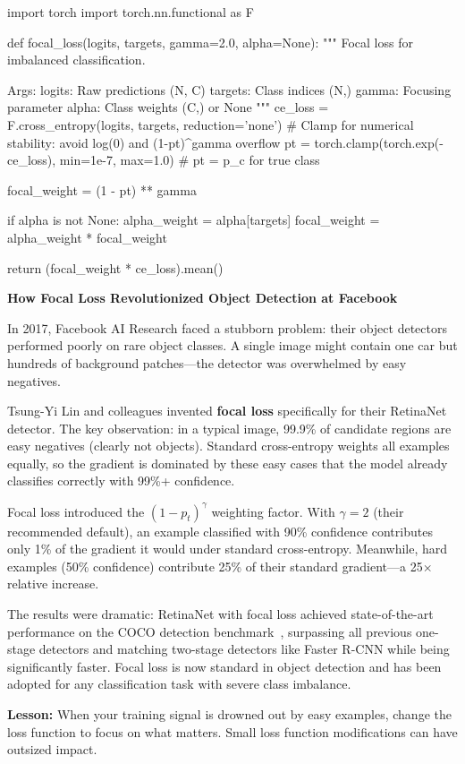 \documentclass[../../main.tex]{subfiles}
\begin{document}
\begin{pythoncode}
import torch
import torch.nn.functional as F

def focal_loss(logits, targets, gamma=2.0, alpha=None):
    """
    Focal loss for imbalanced classification.

    Args:
        logits: Raw predictions (N, C)
        targets: Class indices (N,)
        gamma: Focusing parameter
        alpha: Class weights (C,) or None
    """
    ce_loss = F.cross_entropy(logits, targets, reduction='none')
    # Clamp for numerical stability: avoid log(0) and (1-pt)^gamma overflow
    pt = torch.clamp(torch.exp(-ce_loss), min=1e-7, max=1.0)  # pt = p_c for true class

    focal_weight = (1 - pt) ** gamma

    if alpha is not None:
        alpha_weight = alpha[targets]
        focal_weight = alpha_weight * focal_weight

    return (focal_weight * ce_loss).mean()
\end{pythoncode}

\begin{warstory}
\textbf{How Focal Loss Revolutionized Object Detection at Facebook}

In 2017, Facebook AI Research faced a stubborn problem: their object detectors performed poorly on rare object classes. A single image might contain one car but hundreds of background patches---the detector was overwhelmed by easy negatives.

Tsung-Yi Lin and colleagues invented \textbf{focal loss} specifically for their RetinaNet detector. The key observation: in a typical image, 99.9\% of candidate regions are easy negatives (clearly not objects). Standard cross-entropy weights all examples equally, so the gradient is dominated by these easy cases that the model already classifies correctly with 99\%+ confidence.

Focal loss introduced the $(1 - p_t)^\gamma$ weighting factor. With $\gamma = 2$ (their recommended default), an example classified with 90\% confidence contributes only 1\% of the gradient it would under standard cross-entropy. Meanwhile, hard examples (50\% confidence) contribute 25\% of their standard gradient---a 25$\times$ relative increase.

The results were dramatic: RetinaNet with focal loss achieved state-of-the-art performance on the COCO detection benchmark~\cite{lin2017focal}, surpassing all previous one-stage detectors and matching two-stage detectors like Faster R-CNN while being significantly faster. Focal loss is now standard in object detection and has been adopted for any classification task with severe class imbalance.

\textbf{Lesson:} When your training signal is drowned out by easy examples, change the loss function to focus on what matters. Small loss function modifications can have outsized impact.
\end{warstory}
\end{document}
